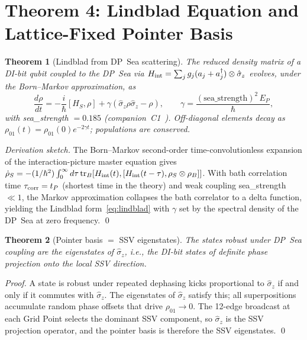 \documentclass[11pt,a4paper]{article}
\newtheorem{theorem}{Theorem}[section]
\newcommand{\tP}{t_P}
\newcommand{\EP}{E_P}
\begin{document}
\section{Theorem 4: Lindblad Equation and Lattice-Fixed Pointer Basis}

\begin{theorem}[Lindblad from DP~Sea scattering]
\label{thm:lindblad}
The reduced density matrix of a DI-bit qubit coupled to the DP~Sea via
$H_{\rm int} = \sum_j g_j(a_j + a_j^\dagger)\otimes\hat{\sigma}_z$
evolves, under the Born--Markov approximation, as
\begin{equation}
\frac{d\rho}{dt} = -\frac{i}{\hbar}[H_S,\rho]
+ \gamma(\hat{\sigma}_z\rho\hat{\sigma}_z - \rho),
\qquad
\gamma = \frac{(\text{sea\_strength})^2\,\EP}{\hbar},
\label{eq:lindblad}
\end{equation}
with sea\_strength $= 0.185$ (companion~C1~\citep{abshier2026c1}).
Off-diagonal elements decay as
$\rho_{01}(t) = \rho_{01}(0)e^{-2\gamma t}$; populations are
conserved.
\end{theorem}

\begin{proof}[Derivation sketch]
The Born--Markov second-order time-convolutionless expansion of the
interaction-picture master equation gives
$\dot\rho_S = -(1/\hbar^2)\int_0^\infty d\tau\,
\mathrm{tr}_B[H_{\rm int}(t),[H_{\rm int}(t-\tau),\rho_S\otimes\rho_B]]$.
With bath correlation time $\tau_{\rm corr} = \tP$ (shortest time in the
theory) and weak coupling sea\_strength $\ll 1$, the Markov approximation
collapses the bath correlator to a delta function, yielding the
Lindblad form~\eqref{eq:lindblad} with $\gamma$ set by the spectral
density of the DP~Sea at zero frequency. \qed
\end{proof}

\begin{theorem}[Pointer basis $=$ SSV eigenstates]
\label{thm:pointer}
The states robust under DP~Sea coupling are the eigenstates of
$\hat{\sigma}_z$, i.e., the DI-bit states of definite phase
projection onto the local SSV direction.
\end{theorem}

\begin{proof}
A state is robust under repeated dephasing kicks proportional to
$\hat{\sigma}_z$ if and only if it commutes with $\hat{\sigma}_z$.
The eigenstates of $\hat{\sigma}_z$ satisfy this; all superpositions
accumulate random phase offsets that drive $\rho_{01} \to 0$.
The 12-edge broadcast at each Grid Point selects the dominant SSV
component, so $\hat{\sigma}_z$ is the SSV projection operator, and
the pointer basis is therefore the SSV eigenstates. \qed
\end{proof}
\end{document}
